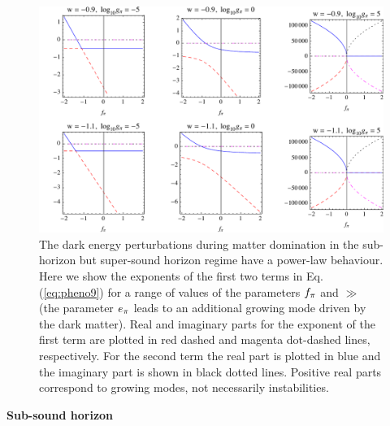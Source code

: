 \begin{figure}[tb]
\centering
\includegraphics[width=\textwidth]{figures/chapter-ade/expogrid1.pdf}
\caption{The dark energy perturbations during matter domination in the sub-horizon but super-sound horizon regime have a power-law behaviour. Here we show the exponents of the first two terms in Eq. (\ref{eq:pheno9}) for a range of values of the parameters $\ff$ and $\gg$ (the parameter $\aa$ leads to an additional growing mode
driven by the dark matter). Real and imaginary parts for the exponent of the first term are plotted in red dashed and magenta dot-dashed lines, respectively. For the second term the real part is plotted in blue and the imaginary part is shown in black dotted lines. Positive real parts correspond to growing modes, not necessarily instabilities.}
\label{fig:expogrid1}
\end{figure}

\noindent\textbf{Sub-sound horizon}\\

